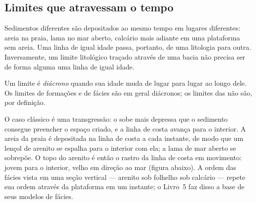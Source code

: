 \subsection*{Limites que atravessam o tempo}

Sedimentos diferentes são depositados ao mesmo tempo em lugares diferentes: areia na praia,
lama no mar aberto, calcário mais adiante em uma plataforma sem areia. Uma linha de igual
idade passa, portanto, de uma litologia para outra. Inversamente, um limite litológico traçado
através de uma bacia não precisa ser de forma alguma uma linha de igual idade.

\begin{definition}\label{def:b1:stratigraphic-scale:diachronous}
Um limite é \emph{diácrono} quando sua idade muda de lugar para lugar
ao longo dele. Os limites de formações e de fácies são em geral diácronos; os limites das
 não são, por definição.
\end{definition}

O caso clássico é uma transgressão: o  sobe mais depressa que o sedimento
consegue preencher o espaço criado, e a linha de costa avança para o interior. A areia da praia
é depositada na linha de costa a cada instante, de modo que um lençol de arenito se espalha
para o interior com ela; a lama de mar aberto se sobrepõe. O topo do arenito é então o rastro
da linha de costa em movimento: jovem para o interior, velho em direção ao mar (figura
abaixo). A ordem das fácies vista em uma seção vertical --- arenito sob folhelho sob calcário
--- repete sua ordem através da plataforma em um instante; o Livro~5 faz disso a base de
seus modelos de fácies.

